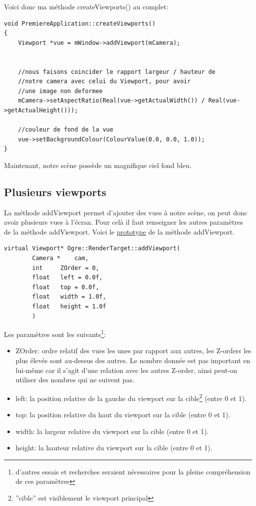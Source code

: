 Voici donc ma m\'ethode createViewports() au complet:
\begin{lstlisting}[caption={Cr\'eation d'un viewport}]
void PremiereApplication::createViewports()
{
    Viewport *vue = mWindow->addViewport(mCamera);
    
    
    //nous faisons coincider le rapport largeur / hauteur de 
    //notre camera avec celui du Viewport, pour avoir 
    //une image non deformee
    mCamera->setAspectRatio(Real(vue->getActualWidth()) / Real(vue->getActualHeight()));
    
    //couleur de fond de la vue
    vue->setBackgroundColour(ColourValue(0.0, 0.0, 1.0));
}
\end{lstlisting}


Maintenant, notre sc\`ene poss\`ede un magnifique ciel fond bleu.









\subsection{Plusieurs viewports}
La m\'ethode addViewport permet d'ajouter des vues \`a notre sc\`ene, on peut donc avoir plusieurs vues \`a l'\'ecran. Pour cel\`a il faut renseigner les autres param\`etres de la m\'ethode addViewport.\newline
Voici le \href{http://www.ogre3d.org/docs/api/1.9/classOgre_1_1RenderTarget.html#a1a558e64db9dfd7cc4cec4547fca0e39}{prototype} de la m\'ethode addViewport.


\begin{lstlisting}[caption={Prototype de addViewport}]
virtual Viewport* Ogre::RenderTarget::addViewport(
	 	Camera *  	cam,
		int  	ZOrder = 0,
		float  	left = 0.0f,
		float  	top = 0.0f,
		float  	width = 1.0f,
		float  	height = 1.0f 
		) 
\end{lstlisting}

Les param\`etres sont les suivants\footnote{d'autres essais et recherches seraient n\'ecessaires pour la pleine compr\'ehension de ces param\`etres}:
\begin{itemize}
\item ZOrder: ordre relatif des vues les unes par rapport aux autres, les Z-orders les plus \'elev\'es sont au-dessus des autres. Le nombre donn\'ee est pas important en lui-m\^eme car il s'agit d'une relation avec les autres Z-order, ainsi peut-on utiliser des nombres qui ne suivent pas.
\item left: la position relative de la gauche du viewport sur la cible\footnote{''cible'' est visiblement le viewport principal} (entre 0 et 1).
\item top: la position relative du haut du viewport sur la cible (entre 0 et 1).
\item width: la largeur relative du viewport sur la cible (entre 0 et 1).
\item height: la hauteur relative du viewport sur la cible (entre 0 et 1).
\end{itemize}


